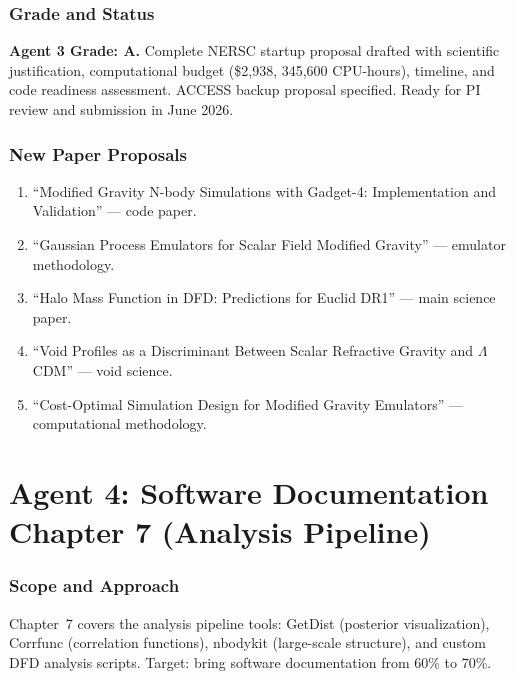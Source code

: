 \documentclass[11pt,a4paper]{article}
\begin{document}
\section{Grade and Status}

\begin{tcolorbox}[colback=green!5!white,colframe=green!40!black]
\textbf{Agent 3 Grade: A.} Complete NERSC startup proposal drafted with scientific justification, computational budget (\$2,938, 345,600 CPU-hours), timeline, and code readiness assessment. ACCESS backup proposal specified. Ready for PI review and submission in June 2026.
\end{tcolorbox}

\section{New Paper Proposals}

\begin{enumerate}
\item ``Modified Gravity N-body Simulations with Gadget-4: Implementation and Validation'' --- code paper.
\item ``Gaussian Process Emulators for Scalar Field Modified Gravity'' --- emulator methodology.
\item ``Halo Mass Function in DFD: Predictions for Euclid DR1'' --- main science paper.
\item ``Void Profiles as a Discriminant Between Scalar Refractive Gravity and $\Lambda$CDM'' --- void science.
\item ``Cost-Optimal Simulation Design for Modified Gravity Emulators'' --- computational methodology.
\end{enumerate}


\part{Agent 4: Software Documentation Chapter 7 (Analysis Pipeline)}
\label{part:software-ch7}

\section{Scope and Approach}

Chapter~7 covers the analysis pipeline tools: GetDist (posterior visualization), Corrfunc (correlation functions), nbodykit (large-scale structure), and custom DFD analysis scripts. Target: bring software documentation from 60\% to 70\%.
\end{document}

